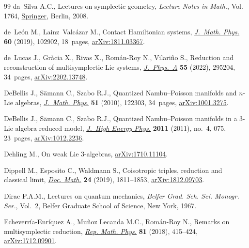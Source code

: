 \documentclass[pdftex]{sigma}
\numberwithin{equation}{section}
\begin{document}
\begin{thebibliography}{99}
da~Silva A.C., Lectures on symplectic geometry, \textit{Lecture Notes in
  Math.}, Vol. 1764, \href{https://doi.org/10.1007/978-3-540-45330-7}{Springer}, Berlin, 2008.

de~Le\'on M., Lainz~Valc\'azar M., Contact {H}amiltonian systems,
  \href{https://doi.org/10.1063/1.5096475}{\textit{J.~Math. Phys.}} \textbf{60} (2019), 102902, 18~pages,
  \href{https://arxiv.org/abs/1811.03367}{arXiv:1811.03367}.

de~Lucas J., Gr\`acia X., Rivas X., Rom\'an-Roy N., Vilari\~no S., Reduction
  and reconstruction of multisymplectic {L}ie systems, \href{https://doi.org/10.1088/1751-8121/ac78ab}{\textit{J.~Phys.~A}}
  \textbf{55} (2022), 295204, 34~pages, \href{https://arxiv.org/abs/2202.13748}{arXiv:2202.13748}.

DeBellis J., S\"amann C., Szabo R.J., Quantized {N}ambu--{P}oisson manifolds
  and {$n$}-{L}ie algebras, \href{https://doi.org/10.1063/1.3503773}{\textit{J.~Math. Phys.}} \textbf{51} (2010), 122303,
  34~pages, \href{https://arxiv.org/abs/1001.3275}{arXiv:1001.3275}.

DeBellis J., S\"amann C., Szabo R.J., Quantized {N}ambu--{P}oisson manifolds in
  a 3-{L}ie algebra reduced model, \href{https://doi.org/10.1007/JHEP04(2011)075}{\textit{J.~High Energy Phys.}} \textbf{2011}
  (2011), no.~4, 075, 23~pages, \href{https://arxiv.org/abs/1012.2236}{arXiv:1012.2236}.

Dehling M., On weak Lie 3-algebras, \href{https://arxiv.org/abs/1710.11104}{arXiv:1710.11104}.

Dippell M., Esposito C., Waldmann S., Coisotropic triples, reduction and
  classical limit, \href{https://doi.org/10.4171/DM/716}{\textit{Doc. Math.}} \textbf{24} (2019), 1811--1853,
  \href{https://arxiv.org/abs/1812.09703}{arXiv:1812.09703}.

Dirac P.A.M., Lectures on quantum mechanics, \textit{Belfer Grad. Sch. Sci.
  Monogr. Ser.}, Vol.~2, Belfer Graduate School of Science, New York, 1967.

Echeverr\'ia-Enr\'iquez A., Mu\~noz Lecanda M.C., Rom\'an-Roy N., Remarks on
  multisymplectic reduction, \href{https://doi.org/10.1016/S0034-4877(18)30057-0}{\textit{Rep. Math. Phys.}} \textbf{81} (2018),
  415--424, \href{https://arxiv.org/abs/1712.09901}{arXiv:1712.09901}.


\end{thebibliography}
\end{document}
